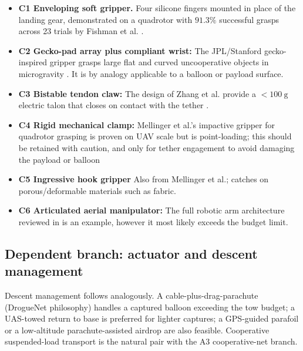 \begin{itemize}[leftmargin=*]
    \item \textbf{C1 Enveloping soft gripper.} Four silicone fingers mounted in place of the landing gear, demonstrated on a quadrotor with $91.3\%$ successful grasps across 23 trials by Fishman et al. \cite{Fishman2021DynamicPractice}.
    
    \item \textbf{C2 Gecko-pad array plus compliant wrist:} The JPL/Stanford gecko-inspired gripper grasps large flat and curved uncooperative objects in microgravity \cite{Jiang2017AMicrogravity}. It is by analogy applicable to a balloon or payload surface. 

    \item \textbf{C3 Bistable tendon claw:} The design of Zhang et al. provide a $<\!\SI{100}{\gram}$ electric talon that closes on contact with the tether \cite{Zhao2025DesignDrones}.

    \item \textbf{C4 Rigid mechanical clamp:} Mellinger et al.'s impactive gripper for quadrotor grasping \cite{Mellinger20112011Systems} is proven on UAV scale but is point-loading; this should be retained with caution, and only for tether engagement to avoid damaging the payload or balloon

    \item \textbf{C5 Ingressive hook gripper} Also from Mellinger et al.\cite{Mellinger20112011Systems}; catches on porous/deformable materials such as fabric.

    \item \textbf{C6 Articulated aerial manipulator:} The full robotic arm architecture reviewed in\cite{Ruggiero2018AerialReview} is an example, however it most likely exceeds the budget limit. 
\end{itemize}

\subsection{Dependent branch: actuator and descent management}


Descent management follows analogously. A cable-plus-drag-parachute (DrogueNet philosophy\cite{Fortem}) handles a captured balloon exceeding the tow budget; a UAS-towed return to base \cite{DroneCatcher,Fortem} is preferred for lighter captures; a GPS-guided parafoil \cite{Slegers2005ModelSystem,Ward2014ParafoilShift} or a low-altitude parachute-assisted airdrop\cite{ParaZero} are also feasible. Cooperative suspended-load transport \cite{Sun2025MLoad} is the natural pair with the A3 cooperative-net branch. 

